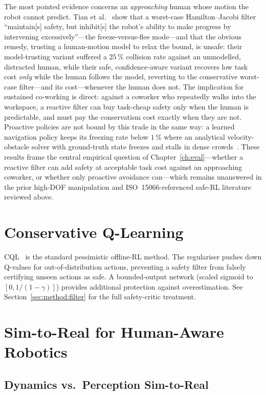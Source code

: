 \documentclass[11pt,a4paper]{report}
\newcommand{\iso}{ISO~15066}
\begin{document}
The most pointed evidence concerns an \emph{approaching} human whose
motion the robot cannot predict. Tian et al.~\cite{tian2022confidence}
show that a worst-case Hamilton--Jacobi filter ``maintain[s] safety, but
inhibit[s] the robot's ability to make progress by intervening
excessively''---the freeze-versus-flee mode---and that the obvious
remedy, trusting a human-motion model to relax the bound, is unsafe:
their model-trusting variant suffered a $25\,\%$ collision rate against
an unmodelled, distracted human, while their safe, confidence-aware
variant recovers low task cost \emph{only} while the human follows the
model, reverting to the conservative worst-case filter---and its
cost---whenever the human does not. The implication for sustained
co-working is direct: against a coworker who repeatedly walks into the
workspace, a reactive filter can buy task-cheap safety only when the
human is predictable, and must pay the conservatism cost exactly when
they are not. Proactive policies are not bound by this trade in the same
way: a learned navigation policy keeps its freezing rate below
$1\,\%$ where an analytical velocity-obstacle solver with ground-truth
state freezes and stalls in dense crowds~\cite{dontfreeze2026}. These
results frame the central empirical question of
Chapter~\ref{ch:eval}---whether a reactive filter can add safety at
acceptable task cost against an approaching coworker, or whether only
proactive avoidance can---which remains unanswered in the prior
high-DOF manipulation and \iso{}-referenced safe-RL literature reviewed
above.

\section{Conservative Q-Learning}
\label{sec:bg:cql}

\textsc{CQL}~\cite{kumar2020cql} is the standard pessimistic
offline-RL method. The regulariser pushes down Q-values for
out-of-distribution actions, preventing a safety filter from
falsely certifying unseen actions as safe. A bounded-output network
(scaled sigmoid to $[0, 1/(1-\gamma)]$) provides additional
protection against overestimation. See
Section~\ref{sec:method:filter} for the full safety-critic
treatment.

\section{Sim-to-Real for Human-Aware Robotics}
\label{sec:bg:sim2real}

\subsection{Dynamics vs.\ Perception Sim-to-Real}
\label{sec:bg:sim2real:dyn-perc}
\end{document}
